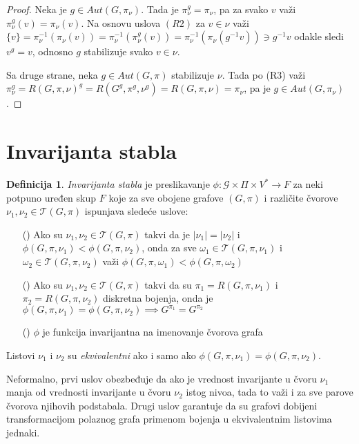 \documentclass[12pt,oneside]{memoir}
\theoremstyle{definition}
\newtheorem*{definition}{Definicija}
\begin{document}
  \begin{proof}
	  Neka je $g \in Aut(G, \pi_\nu)$. Tada je $\pi_\nu^g = \pi_\nu$, pa za
	  svako $v$ važi $\pi_\nu^g(v) = \pi_\nu(v)$. Na osnovu uslova $(R2)$ za $v
	  \in \nu$ važi $\{v\} = \pi_\nu^{-1}(\pi_\nu(v)) =
	  \pi_\nu^{-1}(\pi_\nu^g(v)) = \pi_\nu^{-1}(\pi_\nu(g^{-1}v)) \ni g^{-1}v$
	  odakle sledi $v^g = v$, odnosno $g$ stabilizuje svako $v \in \nu$.

	  Sa druge strane, neka $g \in Aut(G, \pi)$ stabilizuje $\nu$. Tada po (R3)
	  važi $\pi_\nu^g = R(G, \pi, \nu)^g = R(G^g, \pi^g, \nu^g) = R(G, \pi,
	  \nu) = \pi_\nu$, pa je $g \in Aut(G, \pi_\nu)$.
  \end{proof}

 \section{Invarijanta stabla}

  \begin{definition}
	  \emph{Invarijanta stabla} je preslikavanje $\phi : \mathcal{G} \times \Pi
	  \times V^* \to F$ za neki potpuno uređen skup $F$ koje za sve obojene
	  grafove $(G, \pi)$ i različite čvorove $\nu_1, \nu_2 \in \mathcal{T}(G,
	  \pi)$ ispunjava sledeće uslove:

	  \begin{itemize}
		  \item[(\phi1)] Ako su $\nu_1, \nu_2 \in \mathcal{T}(G, \pi)$ takvi
			  da je $|\nu_1|=|\nu_2|$ i $\phi(G, \pi, \nu_1) < \phi(G,
			  \pi, \nu_2)$, onda za sve $\omega_1 \in \mathcal{T}(G, \pi,
			  \nu_1)$ i $\omega_2 \in \mathcal{T}(G, \pi, \nu_2)$ važi
			  $\phi(G, \pi, \omega_1) < \phi(G, \pi, \omega_2)$
		  \item[(\phi2)] Ako su $\nu_1, \nu_2 \in \mathcal{T}(G, \pi)$ takvi
			  da su $\pi_1 = R(G, \pi, \nu_1)$ i $\pi_2 = R(G, \pi, \nu_2)$
			  diskretna bojenja, onda je $\phi(G, \pi, \nu_1) = \phi(G,
			  \pi, \nu_2) \implies G^{\pi_1} = G^{\pi_2}$
		  \item[(\phi3)] $\phi$ je funkcija invarijantna na imenovanje čvorova
			  grafa
	  \end{itemize}

	  Listovi $\nu_1$ i $\nu_2$ su \emph{ekvivalentni} ako i samo ako $\phi(G,
	  \pi, \nu_1) = \phi(G, \pi, \nu_2)$.
  \end{definition}

  Neformalno, prvi uslov obezbeđuje da ako je vrednost invarijante u čvoru
  $\nu_1$ manja od vrednosti invarijante u čvoru $\nu_2$ istog nivoa, tada to
  važi i za sve parove čvorova njihovih podstabala. Drugi uslov garantuje da su
  grafovi dobijeni transformacijom polaznog grafa primenom bojenja u
  ekvivalentnim listovima jednaki.
\end{document}
